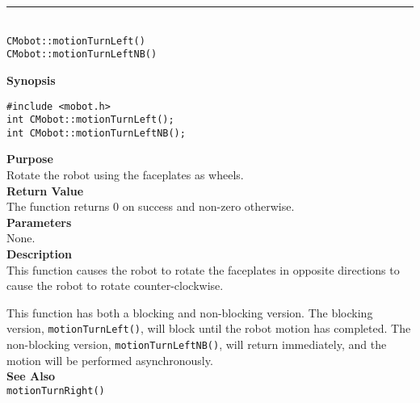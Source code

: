 \noindent
\vspace{5pt}
\rule{4.5in}{0.015in}\\
\noindent
{\LARGE \texttt{CMobot::motionTurnLeft()}}\\
{\LARGE \texttt{CMobot::motionTurnLeftNB()}}\\
{}

\noindent
{\bf Synopsis}\\
\begin{verbatim}
#include <mobot.h>
int CMobot::motionTurnLeft();
int CMobot::motionTurnLeftNB();
\end{verbatim}

\noindent
{\bf Purpose}\\
Rotate the robot using the faceplates as wheels.\\

\noindent
{\bf Return Value}\\
The function returns 0 on success and non-zero otherwise.\\

\noindent
{\bf Parameters}\\
None.\\

\noindent
{\bf Description}\\
This function causes the robot to rotate the faceplates in opposite directions
to cause the robot to rotate counter-clockwise.

This function has both a blocking and non-blocking version.
The blocking version, \texttt{motionTurnLeft()}, will block until the
robot motion has completed. The non-blocking version, \texttt{motionTurnLeftNB()},
will return immediately, and the motion will be performed asynchronously.\\


\noindent
{\bf See Also}\\
\texttt{motionTurnRight()}

